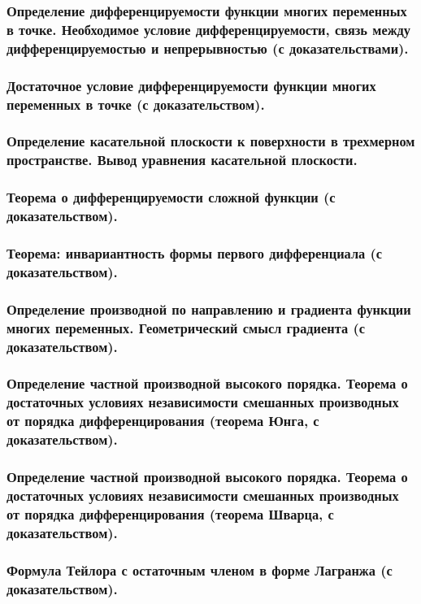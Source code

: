 \documentclass[10pt]{article}
\begin{document}
    \subsubsection{Определение дифференцируемости функции многих переменных в точке. Необходимое условие дифференцируемости, связь между дифференцируемостью и непрерывностью (с доказательствами).}
    \subsubsection{Достаточное условие дифференцируемости функции многих переменных в точке (с доказательством).}
    \subsubsection{Определение касательной плоскости к поверхности в трехмерном пространстве. Вывод уравнения касательной плоскости.}
    \subsubsection{Теорема о дифференцируемости сложной функции (с доказательством).}
    \subsubsection{Теорема: инвариантность формы первого дифференциала (с доказательством).}
    \subsubsection{Определение производной по направлению и градиента функции многих переменных. Геометрический смысл градиента (с доказательством).}
    \subsubsection{Определение частной производной высокого порядка. Теорема о достаточных условиях независимости смешанных производных от порядка дифференцирования (теорема Юнга, с доказательством).}
    \subsubsection{Определение частной производной высокого порядка. Теорема о достаточных условиях независимости смешанных производных от порядка дифференцирования (теорема Шварца, с доказательством).}
    \subsubsection{Формула Тейлора с остаточным членом в форме Лагранжа (с доказательством).}
\end{document}
